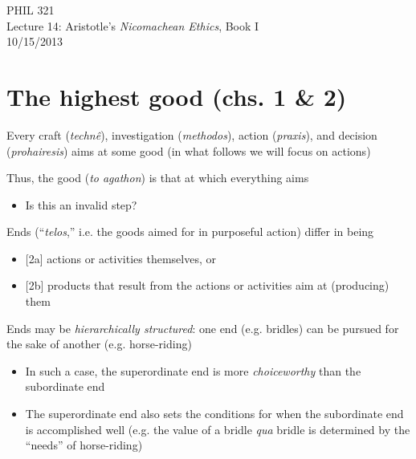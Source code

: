 \documentclass[11pt]{article}
\begin{document}
\thispagestyle{empty}
\begin{center} \LARGE{PHIL 321\\ Lecture 14: Aristotle's \emph{Nicomachean Ethics}, Book I}\\ \vspace*{2mm}
\large{10/15/2013}\end{center}
\thispagestyle{empty}\vspace*{3mm}
\vspace*{-8mm}

\section*{The highest good (chs. 1 \& 2)}

\noindent [1] Every craft (\emph{techn\^{e}}), investigation (\emph{methodos}), action (\emph{praxis}), and decision (\emph{prohairesis}) aims at some good (in what follows we will focus on actions)
\vspace*{2mm}

\noindent [2] Thus, the good (\emph{to agathon}) is that at which everything aims

\begin{itemize}\item{Is this an invalid step?}\end{itemize}

\noindent [3] Ends (``\emph{telos},'' i.e. the goods aimed for in purposeful action) differ in being
\begin{itemize}\item{[2a] actions or activities themselves, or}\item{[2b] products that result from the actions or activities aim at (producing) them}\end{itemize}

\noindent [4] Ends may be \emph{hierarchically structured}: one end (e.g. bridles) can be pursued for the sake of another (e.g. horse-riding)
\begin{itemize}\item{In such a case, the superordinate end is more \emph{choiceworthy} than the subordinate end}\item{The superordinate end also sets the conditions for when the subordinate end is accomplished well (e.g. the value of a bridle \emph{qua} bridle is determined by the ``needs'' of horse-riding)}\end{itemize}
\end{document}
